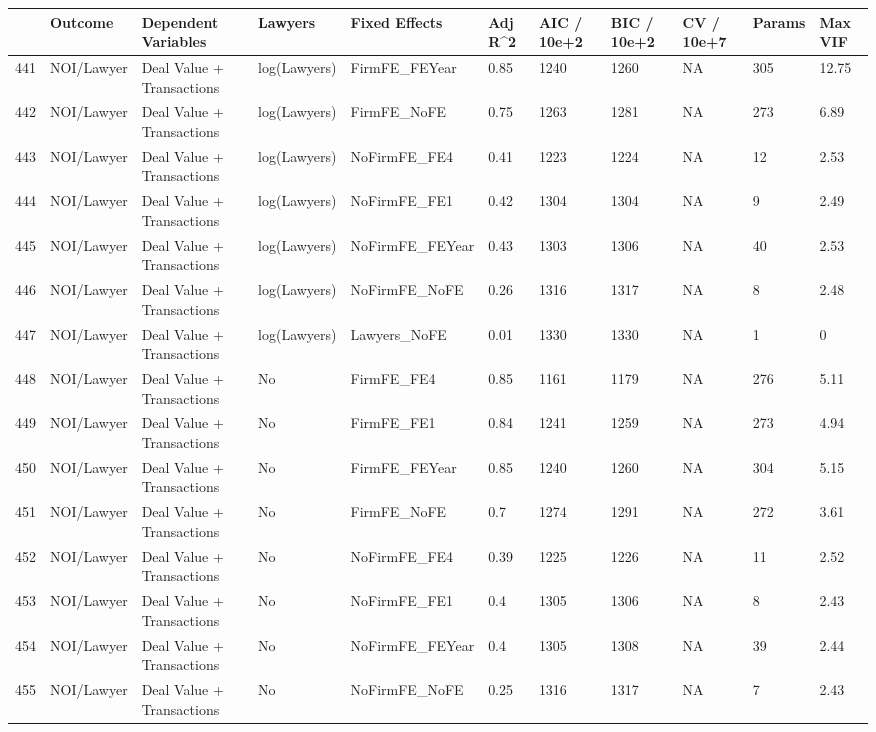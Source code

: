 \documentclass{article}
\begin{document}
\begin{table}[H]
\centering
\begin{tabular}{rllllllllll}
  \hline
 & Outcome & Dependent Variables & Lawyers & Fixed Effects & Adj R^2 & AIC / 10e+2 & BIC / 10e+2 & CV / 10e+7 & Params & Max VIF \\
  \hline
441 & NOI/Lawyer & Deal Value + Transactions & log(Lawyers) & FirmFE\_FEYear & 0.85 & 1240 & 1260 & NA & 305 & 12.75 \\
  442 & NOI/Lawyer & Deal Value + Transactions & log(Lawyers) & FirmFE\_NoFE & 0.75 & 1263 & 1281 & NA & 273 & 6.89 \\
  443 & NOI/Lawyer & Deal Value + Transactions & log(Lawyers) & NoFirmFE\_FE4 & 0.41 & 1223 & 1224 & NA & 12 & 2.53 \\
  444 & NOI/Lawyer & Deal Value + Transactions & log(Lawyers) & NoFirmFE\_FE1 & 0.42 & 1304 & 1304 & NA & 9 & 2.49 \\
  445 & NOI/Lawyer & Deal Value + Transactions & log(Lawyers) & NoFirmFE\_FEYear & 0.43 & 1303 & 1306 & NA & 40 & 2.53 \\
  446 & NOI/Lawyer & Deal Value + Transactions & log(Lawyers) & NoFirmFE\_NoFE & 0.26 & 1316 & 1317 & NA & 8 & 2.48 \\
  447 & NOI/Lawyer & Deal Value + Transactions & log(Lawyers) & Lawyers\_NoFE & 0.01 & 1330 & 1330 & NA & 1 & 0 \\
  448 & NOI/Lawyer & Deal Value + Transactions & No & FirmFE\_FE4 & 0.85 & 1161 & 1179 & NA & 276 & 5.11 \\
  449 & NOI/Lawyer & Deal Value + Transactions & No & FirmFE\_FE1 & 0.84 & 1241 & 1259 & NA & 273 & 4.94 \\
  450 & NOI/Lawyer & Deal Value + Transactions & No & FirmFE\_FEYear & 0.85 & 1240 & 1260 & NA & 304 & 5.15 \\
  451 & NOI/Lawyer & Deal Value + Transactions & No & FirmFE\_NoFE & 0.7 & 1274 & 1291 & NA & 272 & 3.61 \\
  452 & NOI/Lawyer & Deal Value + Transactions & No & NoFirmFE\_FE4 & 0.39 & 1225 & 1226 & NA & 11 & 2.52 \\
  453 & NOI/Lawyer & Deal Value + Transactions & No & NoFirmFE\_FE1 & 0.4 & 1305 & 1306 & NA & 8 & 2.43 \\
  454 & NOI/Lawyer & Deal Value + Transactions & No & NoFirmFE\_FEYear & 0.4 & 1305 & 1308 & NA & 39 & 2.44 \\
  455 & NOI/Lawyer & Deal Value + Transactions & No & NoFirmFE\_NoFE & 0.25 & 1316 & 1317 & NA & 7 & 2.43 \\

\end{tabular}
\end{table}
\end{document}
